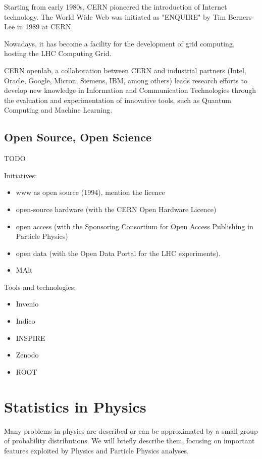 Starting from early 1980s, CERN pioneered the introduction of Internet technology. The World Wide Web was initiated as "ENQUIRE" by Tim Berners-Lee in 1989 at CERN.

Nowadays, it has become a facility for the development of grid computing, hosting the LHC Computing Grid.

CERN openlab, a collaboration between CERN and industrial partners (Intel, Oracle, Google, Micron, Siemens, IBM, among others) leads research efforts to develop new knowledge in Information and Communication Technologies through the evaluation and experimentation of innovative tools, such as Quantum Computing and Machine Learning.

\subsection{Open Source, Open Science}

TODO

Initiatives:

\begin{itemize}
	\item www as open source (1994), mention the licence
	\item open-source hardware (with the CERN Open Hardware Licence)
	\item open access (with the Sponsoring Consortium for Open Access Publishing in Particle Physics)
	\item open data (with the Open Data Portal for the LHC experiments).
	\item MAlt
\end{itemize}

Tools and technologies:

\begin{itemize}
	\item Invenio
	\item Indico
	\item INSPIRE
	\item Zenodo
	\item ROOT
\end{itemize}
\section{Statistics in Physics}

Many problems in physics are described or can be approximated by a small group of probability distributions. We will briefly describe them, focusing on important features exploited by Physics and Particle Physics \cite{leo2012techniques} analyses.

